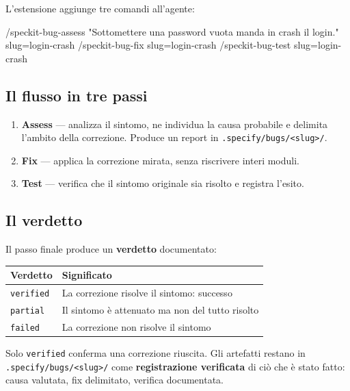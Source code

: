 \documentclass[
  italian,
  10pt,
]{book}
\newenvironment{Shaded}{\begin{snugshade}}{\end{snugshade}}
\newcommand{\NormalTok}[1]{#1}
\newcounter{none} %
\providecommand{\tightlist}{%
  \setlength{\itemsep}{0pt}\setlength{\parskip}{0pt}}
\begin{document}
L'estensione aggiunge tre comandi all'agente:

\begin{Shaded}
\begin{Highlighting}[]
\NormalTok{/speckit{-}bug{-}assess "Sottomettere una password vuota manda in crash il login." slug=login{-}crash}
\NormalTok{/speckit{-}bug{-}fix slug=login{-}crash}
\NormalTok{/speckit{-}bug{-}test slug=login{-}crash}
\end{Highlighting}
\end{Shaded}

\subsection{Il flusso in tre passi}\label{il-flusso-in-tre-passi}

\begin{enumerate}
\def\labelenumi{\arabic{enumi}.}
\tightlist
\item
  \textbf{Assess} --- analizza il sintomo, ne individua la causa
  probabile e delimita l'ambito della correzione. Produce un report in
  \texttt{.specify/bugs/\textless{}slug\textgreater{}/}.
\item
  \textbf{Fix} --- applica la correzione mirata, senza riscrivere interi
  moduli.
\item
  \textbf{Test} --- verifica che il sintomo originale sia risolto e
  registra l'esito.
\end{enumerate}

\subsection{Il verdetto}\label{il-verdetto}

Il passo finale produce un \textbf{verdetto} documentato:

{\def\LTcaptype{none} %
\begin{longtable}[]{@{}ll@{}}
\toprule\noalign{}
Verdetto & Significato \\
\midrule\noalign{}
\endhead
\bottomrule\noalign{}
\endlastfoot
\texttt{verified} & La correzione risolve il sintomo: successo \\
\texttt{partial} & Il sintomo è attenuato ma non del tutto risolto \\
\texttt{failed} & La correzione non risolve il sintomo \\
\end{longtable}
}

Solo \texttt{verified} conferma una correzione riuscita. Gli artefatti
restano in \texttt{.specify/bugs/\textless{}slug\textgreater{}/} come
\textbf{registrazione verificata} di ciò che è stato fatto: causa
valutata, fix delimitato, verifica documentata.
\end{document}
